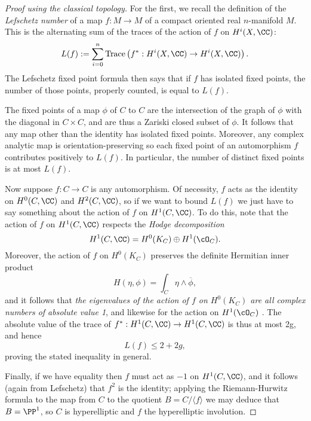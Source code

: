 \begin{proof}[Proof  using the classical topology]
For the first, we recall the definition of the \emph{Lefschetz number} of a map $f : M \to M$ of a compact oriented real $n$-manifold $M$. This is the alternating sum of the traces of the action of $f$ on $H^i(X,\CC)$:
$$
L(f) := \sum_{i=0}^n {\rm Trace}\left(f^* : H^i(X,\CC) \to H^i(X,\CC)\right).
$$
The Lefschetz fixed point formula then says that if $f$ has isolated fixed points, the number of those points, properly counted, is equal to $L(f)$.

The fixed points of a map $\phi$ of $C$ to $C$ are the intersection of the graph of $\phi$ with the diagonal in $C\times C$, and are thus a Zariski closed subset of $\phi$. It follows that any map other than the identity has isolated fixed points. Moreover, any complex analytic map is orientation-preserving  so each fixed point of an automorphism $f$ contributes positively to $L(f)$. In particular,  the number of distinct fixed points is at most $L(f)$.

Now suppose $f: C \to C$ is any automorphism. Of necessity, $f$ acts as the identity on $H^0(C, \CC)$ and $H^2(C, \CC)$, so if we want to bound $L(f)$ we just have to say something about the action of $f$ on $H^1(C,\CC)$. To do this, note that  the action of $f$ on $H^1(C,\CC)$ respects the \emph{Hodge decomposition}
$$
H^1(C,\CC)  = H^0(K_C) \oplus H^1(\cO_C).
$$  
Moreover, the action of $f$ on $H^0(K_C)$ preserves the definite Hermitian inner product
$$
H(\eta, \phi) = \int_C \eta \wedge \overline \phi,
$$
and it follows that \emph{the eigenvalues of the action of $f$ on $H^0(K_C)$ are all complex numbers of absolute value 1}, and likewise for the action on $H^1(\cO_C)$  . The absolute value of the trace of $f^*: H^1(C,\CC) \to H^1(C,\CC)$ is thus at most 2g, and hence
$$
L(f) \leq 2 + 2g,
$$
 proving the stated inequality in general.

Finally, if we have equality then $f$ must act as $-1$ on $H^1(C,\CC)$,  and it follows (again from Lefschetz) that $f^2$ is the identity; applying the Riemann-Hurwitz formula to the map from $C$ to the quotient $B = C/\langle f \rangle$ we may deduce that $B = \PP^1$, so $C$ is hyperelliptic and $f$ the hyperelliptic involution.
\end{proof}

